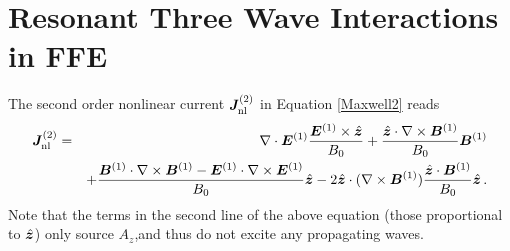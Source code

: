 
\chapter{Resonant Three Wave Interactions in FFE}
\label{app:wave-interaction}

The second order nonlinear current $\boldsymbol{J}^{(2)}_{\rm nl}$ in Equation \ref{Maxwell2} reads
\begin{eqnarray}\label{J2}
	\boldsymbol{J}^{(2)}_{\rm nl} &=& \nabla\cdot\boldsymbol{E}^{(1)}\frac{\boldsymbol{E}^{(1)}\times\hat{\boldsymbol{z}}}{B_0} + \frac{\hat{\boldsymbol{z}}\cdot\nabla\times\boldsymbol{B}^{(1)}}{B_0}\boldsymbol{B}^{(1)} \nonumber\\
	&&+\frac{\boldsymbol{B}^{(1)}\cdot\nabla\times\boldsymbol{B}^{(1)} - \boldsymbol{E}^{(1)}\cdot\nabla\times\boldsymbol{E}^{(1)}}{B_0}\hat{\boldsymbol{z}}-2\hat{\boldsymbol{z}}\cdot(\nabla\times\boldsymbol{B}^{(1)})\frac{\hat{\boldsymbol{z}}\cdot\boldsymbol{B}^{(1)}}{B_0}\hat{\boldsymbol{z}} \, .
\end{eqnarray}
Note that the terms in the second line of the above equation (those proportional to $\hat{\boldsymbol{z}}$) only source $A_z$,and thus do not excite any propagating waves. 

